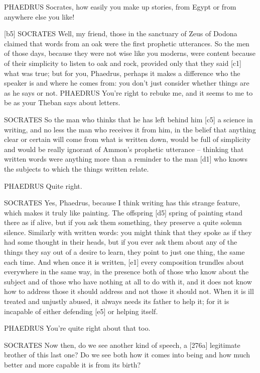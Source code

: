PHAEDRUS Socrates, how easily you make up stories, from Egypt or from
anywhere else you like!

{[}b5{]} SOCRATES Well, my friend, those in the sanctuary of Zeus of
Dodona claimed that words from an oak were the first prophetic
utterances. So the men of those days, because they were not wise like
you moderns, were content because of their simplicity to listen to oak
and rock, provided only
that they said {[}c1{]} what was true; but for you, Phaedrus, perhaps it
makes a difference who the speaker is and where he comes from: you don't
just consider whether things are as he says or not. PHAEDRUS You're
right to rebuke me, and it seems to me to be as your Theban says about
letters.

SOCRATES So the man who thinks that he has left behind him {[}c5{]} a
science in writing, and no less the man who receives it from him, in the
belief that anything clear or certain will come from what is written
down, would be full of simplicity and would be really ignorant of
Ammon's prophetic utterance -- thinking that written words were anything
more than a reminder to the man {[}d1{]} who knows the subjects to which
the things written relate.

PHAEDRUS Quite right.

SOCRATES Yes, Phaedrus, because I think writing has this strange
feature, which makes it truly like painting. The offspring {[}d5{]}
spring of painting stand there as if alive, but if you ask them
something, they preserve a quite solemn silence. Similarly with written
words: you might think that they spoke as if they had some thought in
their heads, but if you ever ask them about any of the things they say
out of a desire to learn, they point to just one thing, the same each
time. And when once it is written, {[}e1{]} every composition trundles
about everywhere in the same way, in the presence both of those who know
about the subject and of those who have nothing at all to do with it,
and it does not know how to address those it should address and not
those it should not. When it is ill treated and unjustly abused, it
always needs its father to help it; for it is incapable of either
defending {[}e5{]} or helping itself.

PHAEDRUS You're quite right about that too.

SOCRATES Now then, do we see another kind of
speech, a {[}276a{]}
legitimate brother of this last one? Do we see both how it comes into
being and how much better and more capable it is from its birth?

